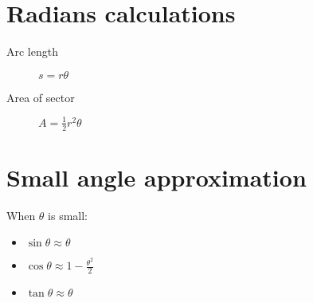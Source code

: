 \section{Radians calculations}
\begin{description}
    \item[Arc length] $s=r\theta$
    \item[Area of sector] $A=\frac{1}{2}r^2\theta$
\end{description}

\section{Small angle approximation}
When $\theta$ is small:
\begin{itemize}
    \item $\sin \theta \approx \theta$
    \item $\cos \theta \approx 1-\frac{\theta^2}{2}$
    \item $\tan \theta \approx \theta$
\end{itemize}
